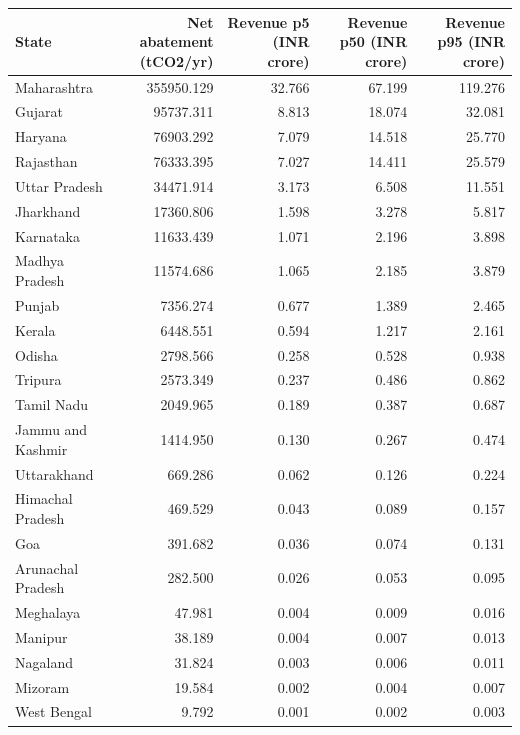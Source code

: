 \begin{tabular}{lrrrr}
\toprule
State & Net abatement (tCO2/yr) & Revenue p5 (INR crore) & Revenue p50 (INR crore) & Revenue p95 (INR crore) \\
\midrule
Maharashtra & 355950.129 & 32.766 & 67.199 & 119.276 \\
Gujarat & 95737.311 & 8.813 & 18.074 & 32.081 \\
Haryana & 76903.292 & 7.079 & 14.518 & 25.770 \\
Rajasthan & 76333.395 & 7.027 & 14.411 & 25.579 \\
Uttar Pradesh & 34471.914 & 3.173 & 6.508 & 11.551 \\
Jharkhand & 17360.806 & 1.598 & 3.278 & 5.817 \\
Karnataka & 11633.439 & 1.071 & 2.196 & 3.898 \\
Madhya Pradesh & 11574.686 & 1.065 & 2.185 & 3.879 \\
Punjab & 7356.274 & 0.677 & 1.389 & 2.465 \\
Kerala & 6448.551 & 0.594 & 1.217 & 2.161 \\
Odisha & 2798.566 & 0.258 & 0.528 & 0.938 \\
Tripura & 2573.349 & 0.237 & 0.486 & 0.862 \\
Tamil Nadu & 2049.965 & 0.189 & 0.387 & 0.687 \\
Jammu and Kashmir & 1414.950 & 0.130 & 0.267 & 0.474 \\
Uttarakhand & 669.286 & 0.062 & 0.126 & 0.224 \\
Himachal Pradesh & 469.529 & 0.043 & 0.089 & 0.157 \\
Goa & 391.682 & 0.036 & 0.074 & 0.131 \\
Arunachal Pradesh & 282.500 & 0.026 & 0.053 & 0.095 \\
Meghalaya & 47.981 & 0.004 & 0.009 & 0.016 \\
Manipur & 38.189 & 0.004 & 0.007 & 0.013 \\
Nagaland & 31.824 & 0.003 & 0.006 & 0.011 \\
Mizoram & 19.584 & 0.002 & 0.004 & 0.007 \\
West Bengal & 9.792 & 0.001 & 0.002 & 0.003 \\
\bottomrule
\end{tabular}
